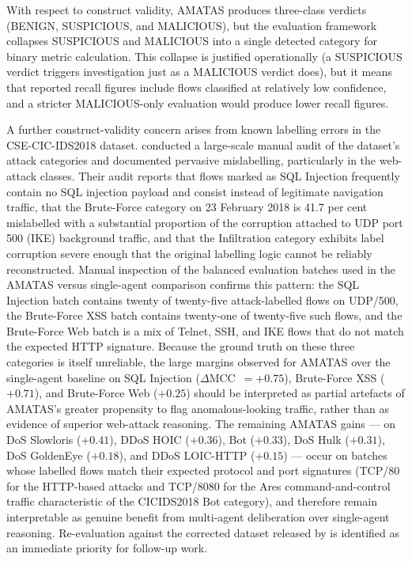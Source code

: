 \documentclass[../main.tex]{subfiles}
\begin{document}
With respect to construct validity, AMATAS produces three-class verdicts (BENIGN, SUSPICIOUS, and MALICIOUS), but the evaluation framework collapses SUSPICIOUS and MALICIOUS into a single detected category for binary metric calculation. This collapse is justified operationally (a SUSPICIOUS verdict triggers investigation just as a MALICIOUS verdict does), but it means that reported recall figures include flows classified at relatively low confidence, and a stricter MALICIOUS-only evaluation would produce lower recall figures.

A further construct-validity concern arises from known labelling errors in the CSE-CIC-IDS2018 dataset. \textcite{Liu2022} conducted a large-scale manual audit of the dataset's attack categories and documented pervasive mislabelling, particularly in the web-attack classes. Their audit reports that flows marked as SQL Injection frequently contain no SQL injection payload and consist instead of legitimate navigation traffic, that the Brute-Force category on 23 February 2018 is 41.7 per cent mislabelled with a substantial proportion of the corruption attached to UDP port 500 (IKE) background traffic, and that the Infiltration category exhibits label corruption severe enough that the original labelling logic cannot be reliably reconstructed. Manual inspection of the balanced evaluation batches used in the AMATAS versus single-agent comparison confirms this pattern: the SQL Injection batch contains twenty of twenty-five attack-labelled flows on UDP/500, the Brute-Force XSS batch contains twenty-one of twenty-five such flows, and the Brute-Force Web batch is a mix of Telnet, SSH, and IKE flows that do not match the expected HTTP signature. Because the ground truth on these three categories is itself unreliable, the large margins observed for AMATAS over the single-agent baseline on SQL Injection ($\Delta$MCC~$=+0.75$), Brute-Force XSS ($+0.71$), and Brute-Force Web ($+0.25$) should be interpreted as partial artefacts of AMATAS's greater propensity to flag anomalous-looking traffic, rather than as evidence of superior web-attack reasoning. The remaining AMATAS gains --- on DoS Slowloris ($+0.41$), DDoS HOIC ($+0.36$), Bot ($+0.33$), DoS Hulk ($+0.31$), DoS GoldenEye ($+0.18$), and DDoS LOIC-HTTP ($+0.15$) --- occur on batches whose labelled flows match their expected protocol and port signatures (TCP/80 for the HTTP-based attacks and TCP/8080 for the Ares command-and-control traffic characteristic of the CICIDS2018 Bot category), and therefore remain interpretable as genuine benefit from multi-agent deliberation over single-agent reasoning. Re-evaluation against the corrected dataset released by \textcite{Liu2022} is identified as an immediate priority for follow-up work.
\end{document}
